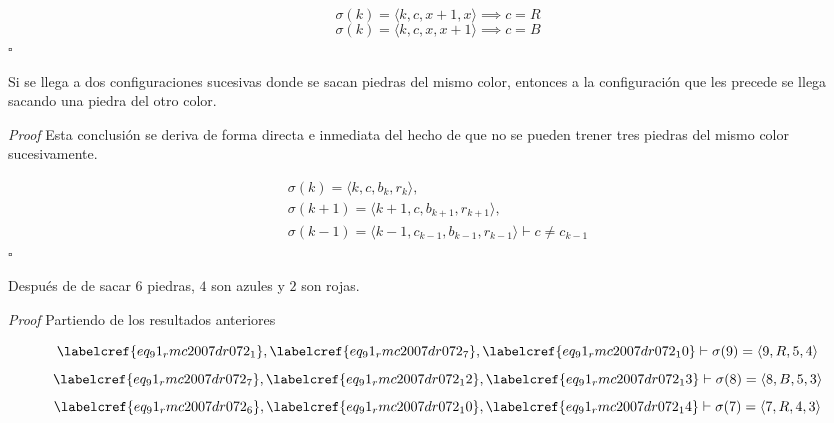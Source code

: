 \begin{equation} \label{eq_91_rmc2007dr072_10}
	\sigma(k) = \langle k, c, x+1, x \rangle \implies c = R
\end{equation}
\begin{equation} \label{eq_91_rmc2007dr072_11}
	\sigma(k) = \langle k, c, x, x+1 \rangle \implies c = B
\end{equation}
\hfill $\square$

\begin{claim}
	Si se llega a dos configuraciones sucesivas donde se sacan piedras del mismo color, entonces a la configuración que les precede se llega sacando una piedra del otro color.
\end{claim}

\textit{Proof}  Esta conclusión se deriva de forma directa e inmediata del hecho de que no se pueden trener tres piedras del mismo color sucesivamente.

\begin{equation} \label{eq_91_rmc2007dr072_12}
	\begin{gathered}
		\sigma(k) = \langle k, c, b_k, r_k \rangle , \\
		\sigma(k+1) = \langle k+1, c, b_{k+1}, r_{k+1} \rangle, \\
		\sigma(k-1) = \langle k-1, c_{k-1}, b_{k-1}, r_{k-1} \rangle \vdash c \neq c_{k-1}
	\end{gathered}
\end{equation}
\hfill $\square$

\begin{claim}
	Después de de sacar $6$ piedras, $4$ son azules y $2$ son rojas.
\end{claim}

\textit{Proof} Partiendo de los resultados anteriores

\begin{equation} \label{eq_91_rmc2007dr072_13}
	\labelcref{eq_91_rmc2007dr072_1}, \labelcref{eq_91_rmc2007dr072_7}, \labelcref{eq_91_rmc2007dr072_10} \vdash \sigma(9) = \langle 9, R, 5, 4 \rangle
\end{equation}
\begin{equation} \label{eq_91_rmc2007dr072_14}
	\labelcref{eq_91_rmc2007dr072_7}, \labelcref{eq_91_rmc2007dr072_12}, \labelcref{eq_91_rmc2007dr072_13} \vdash \sigma(8) = \langle 8, B, 5, 3 \rangle
\end{equation}
\begin{equation} \label{eq_91_rmc2007dr072_15}
	\labelcref{eq_91_rmc2007dr072_6}, \labelcref{eq_91_rmc2007dr072_10}, \labelcref{eq_91_rmc2007dr072_14} \vdash \sigma(7) = \langle 7, R, 4, 3 \rangle
\end{equation}

